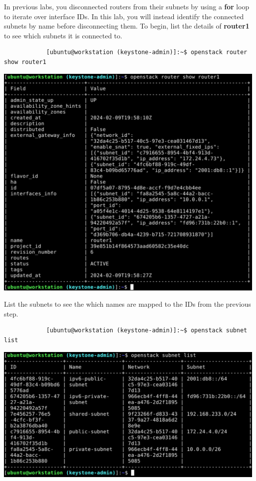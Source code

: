\documentclass[letterpaper, 12pt]{article}
\begin{document}
\begin{enumerate}
    \begin{labstep}
        In previous labs, you disconnected routers from their subnets by using a \textbf{for} loop to iterate over interface IDs.
        In this lab, you will instead identify the connected subnets by name before disconnecting them.
        To begin, list the details of \textbf{router1} to see which subnets it is connected to.
        \begin{lstlisting}
            [ubuntu@workstation (keystone-admin)]:~$ openstack router show router1
        \end{lstlisting}

        \begin{center}
            \includegraphics[width=\linewidth]{images/part1/step6.png}
        \end{center}
    \end{labstep}

    \begin{labstep}
        List the subnets to see the which names are mapped to the IDs from the previous step.
        \begin{lstlisting}
            [ubuntu@workstation (keystone-admin)]:~$ openstack subnet list
        \end{lstlisting}

        \begin{center}
            \includegraphics[width=\linewidth]{images/part1/step7.png}
        \end{center}
    \end{labstep}


\end{enumerate}
\end{document}
